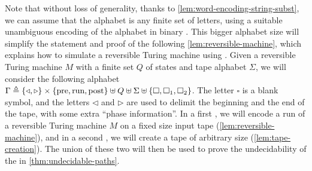 Note that without loss of generality, thanks to
\cref{lem:word-encoding-string-subst}, we can assume that the alphabet is any
finite set of letters, using a suitable unambiguous encoding of the alphabet
in binary \cite{BERST09}. This bigger alphabet size will simplify
the statement and proof of the following \cref{lem:reversible-machine}, which
explains how to simulate a reversible Turing machine using . Given a reversible Turing machine $M$ with a finite set $Q$ of
states and tape alphabet $\Sigma$, we will consider the following alphabet
$\Gamma \triangleq \{  \triangleleft, \triangleright  \} \times \{  \text{pre},
\text{run}, \text{post}  \} \uplus Q \uplus \Sigma \uplus \{  \square,
\square_1, \square_2 \}$. The letter $\square$ is a blank symbol, and the letters
$\triangleleft$ and $\triangleright$ are used to delimit the beginning and the
end of the tape, with some extra ``phase information''. In a first , we will encode a run of a reversible Turing machine $M$ on a
fixed size input tape (\cref{lem:reversible-machine}), and in a second
, we will create a tape of arbitrary size
(\cref{lem:tape-creation}). The union of these two  will then be used to prove the undecidability of the  in \cref{thm:undecidable-paths}.

